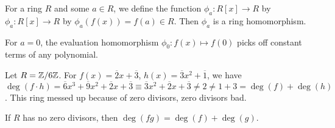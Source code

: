 \begin{theorem}
    For a ring $R$ and some $a \in R$, we define the function $\phi _{a} \colon R[x] \to R$ by  $\phi _{a} \colon R[x] \to R$ by $\phi _{a}(f(x))=f(a) \in R$. Then $\phi_a$ is a ring homomorphism. 
\end{theorem}For $a=0$, the evaluation homomorphism $\phi_0 \colon f(x) \mapsto f(0) $ picks off constant terms of any polynomial.
\begin{example}
    Let $R= \Z /6 \Z$. For $f(x)= \overline{2}x+\overline{3}$, $h(x)=\overline{3}x^2+\overline{1}$, we have $\deg(f\cdot h)= \overline{6}x^3 + \overline{ 9}x^2+ \overline{2}x+ \overline{3}\equiv \overline{3}x^2+\overline{2}x+\overline{3}\neq 2 \neq 1+3 = \deg (f) + \deg(h)$. This ring messed up because of zero divisors, zero divisors bad.
\end{example}
\begin{lemma}
    If $R$ has no zero divisors, then $\deg(fg)=\deg(f)+\deg(g)$.
\end{lemma}
